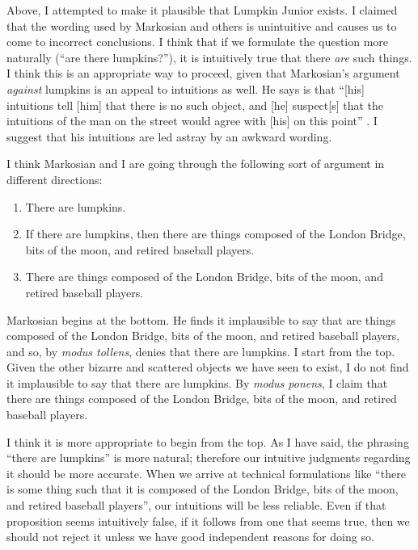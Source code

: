 \documentclass[11pt]{article}
\begin{document}
\begin{spacing}{1.25}
Above, I attempted to make it plausible that Lumpkin Junior exists.  I
claimed that the wording used by Markosian and others is unintuitive
and causes us to come to incorrect conclusions.  I think that if we
formulate the question more naturally (``are there lumpkins?''), it is
intuitively true that there {\em are} such things.  I think this is an
appropriate way to proceed, given that Markosian's argument {\em
  against} lumpkins is an appeal to intuitions as well.  He says is
that ``[his] intuitions tell [him] that there is no such object, and
[he] suspect[s] that the intuitions of the man on the street would
agree with [his] on this point'' \citeyearpar[228]{markosian1998a}.  I
suggest that his intuitions are led astray by an awkward wording.

I think Markosian and I are going through the following sort of
argument in different directions:

\begin{enumerate}
  \item There are lumpkins.
  \item If there are lumpkins, then there are things composed of the
    London Bridge, bits of the moon, and retired baseball players.
  \item There are things composed of the London Bridge, bits of the
    moon, and retired baseball players.
\end{enumerate}

Markosian begins at the bottom.  He finds it implausible to say that
are things composed of the London Bridge, bits of the moon, and
retired baseball players, and so, by {\em modus tollens}, denies that
there are lumpkins.  I start from the top.  Given the other bizarre
and scattered objects we have seen to exist, I do not find it
implausible to say that there are lumpkins.  By {\em modus ponens}, I
claim that there are things composed of the London Bridge, bits of the
moon, and retired baseball players.

I think it is more appropriate to begin from the top.  As I have said,
the phrasing ``there are lumpkins'' is more natural; therefore our
intuitive judgments regarding it should be more accurate.  When we
arrive at technical formulations like ``there is some thing such that
it is composed of the London Bridge, bits of the moon, and retired
baseball players'', our intuitions will be less reliable.  Even if
that proposition seems intuitively false, if it follows from one that
seems true, then we should not reject it unless we have good
independent reasons for doing so.


\end{spacing}
\end{document}
